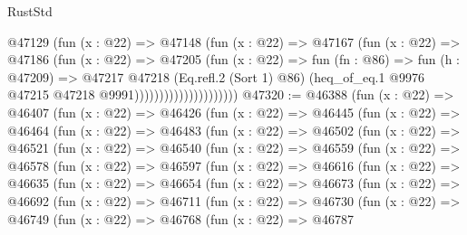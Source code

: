 \begin{lexlean}{RustStd}
\begin{coremodule}
                                @47129
                                  (fun (x : @22) =>
                                  @47148
                                    (fun (x : @22) =>
                                    @47167
                                      (fun (x : @22) =>
                                      @47186
                                        (fun (x : @22) =>
                                        @47205
                                          (fun (x : @22) =>
                                          fun (fn : @86) =>
                                          fun (h : @47209) =>
                                          @47217
                                            @47218
                                            (Eq.refl.{2} (Sort 1) @86)
                                            (heq_of_eq.{1}
                                              @9976
                                              @47215
                                              @47218
                                              @9991)))))))))))))))))))))
@47320 := @46388
    (fun (x : @22) =>
    @46407
      (fun (x : @22) =>
      @46426
        (fun (x : @22) =>
        @46445
          (fun (x : @22) =>
          @46464
            (fun (x : @22) =>
            @46483
              (fun (x : @22) =>
              @46502
                (fun (x : @22) =>
                @46521
                  (fun (x : @22) =>
                  @46540
                    (fun (x : @22) =>
                    @46559
                      (fun (x : @22) =>
                      @46578
                        (fun (x : @22) =>
                        @46597
                          (fun (x : @22) =>
                          @46616
                            (fun (x : @22) =>
                            @46635
                              (fun (x : @22) =>
                              @46654
                                (fun (x : @22) =>
                                @46673
                                  (fun (x : @22) =>
                                  @46692
                                    (fun (x : @22) =>
                                    @46711
                                      (fun (x : @22) =>
                                      @46730
                                        (fun (x : @22) =>
                                        @46749
                                          (fun (x : @22) =>
                                          @46768
                                            (fun (x : @22) =>
                                            @46787

\end{coremodule}
\end{lexlean}
